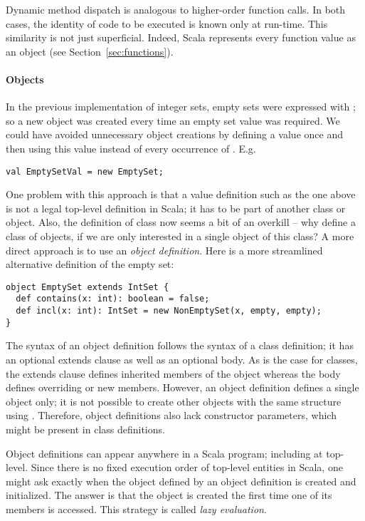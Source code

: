 Dynamic method dispatch is analogous to higher-order function
calls. In both cases, the identity of code to be executed is known
only at run-time. This similarity is not just superficial. Indeed,
Scala represents every function value as an object (see
Section~\ref{sec:functions}).


\paragraph{Objects}

In the previous implementation of integer sets, empty sets were
expressed with ; so a new object was created every time
an empty set value was required. We could have avoided unnecessary
object creations by defining a value  once and then using
this value instead of every occurrence of . E.g.
\begin{lstlisting}
val EmptySetVal = new EmptySet;
\end{lstlisting}
One problem with this approach is that a value definition such as the
one above is not a legal top-level definition in Scala; it has to be
part of another class or object. Also, the definition of class
 now seems a bit of an overkill -- why define a class of objects, 
if we are only interested in a single object of this class? A more
direct approach is to use an {\em object definition}. Here is
a more streamlined alternative definition of the empty set:
\begin{lstlisting}
object EmptySet extends IntSet {
  def contains(x: int): boolean = false;
  def incl(x: int): IntSet = new NonEmptySet(x, empty, empty);
}
\end{lstlisting}
The syntax of an object definition follows the syntax of a class
definition; it has an optional extends clause as well as an optional
body. As is the case for classes, the extends clause defines inherited
members of the object whereas the body defines overriding or new
members.  However, an object definition defines a single object only;
it is not possible to create other objects with the same structure
using .  Therefore, object definitions also lack constructor
parameters, which might be present in class definitions.

Object definitions can appear anywhere in a Scala program; including
at top-level.  Since there is no fixed execution order of top-level
entities in Scala, one might ask exactly when the object defined by an
object definition is created and initialized. The answer is that the
object is created the first time one of its members is accessed. This
strategy is called {\em lazy evaluation}.

